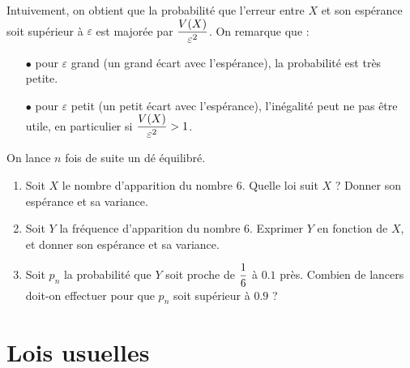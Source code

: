 \documentclass[a4paper, 11pt]{article}
\begin{document}
\begin{rem}
Intuivement, on obtient que la probabilit\'e que l'erreur entre $X$ et son esp\'erance soit sup\'erieur \`a $\varepsilon$ est major\'ee par $\displaystyle \frac{V(X)}{\varepsilon^2}$. On remarque que :
\begin{itemize}
\item[$\bullet$] pour $\varepsilon$ grand (un grand \'ecart avec l'esp\'erance), la probabilit\'e est  très petite. 
\item[$\bullet$] pour $\varepsilon$ petit (un petit \'ecart avec l'esp\'erance), l'in\'egalit\'e peut ne pas \^etre utile, en particulier si $\displaystyle \frac{V(X)}{\varepsilon^2}>1$.
\end{itemize}
\end{rem}

{\footnotesize \begin{exercice} 
On lance $n$ fois de suite un d\'e \'equilibr\'e.
\begin{enumerate}
\item Soit $X$ le nombre d'apparition du nombre $6$. Quelle loi suit $X$ ? Donner son esp\'erance et sa variance.
\item Soit $Y$ la fr\'equence d'apparition du nombre $6$. Exprimer $Y$ en fonction de $X$, et donner son esp\'erance et sa variance.
\item Soit $p_n$ la probabilit\'e que $Y$ soit proche de $\displaystyle \frac{1}{6}$ \`a $0.1$ pr\`es. Combien de lancers doit-on effectuer pour que $p_n$ soit sup\'erieur \`a $0.9$ ?
\end{enumerate}
\end{exercice}}








\section{Lois usuelles}


\end{document}
